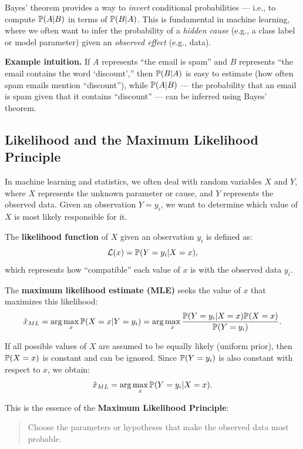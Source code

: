 \documentclass[10pt, letterpaper]{report}
\begin{document}
Bayes’ theorem provides a way to \textit{invert} conditional probabilities — i.e., to compute ${\mathbb P}(A|B)$ in terms of ${\mathbb P}(B|A)$.  
This is fundamental in machine learning, where we often want to infer the probability of a \emph{hidden cause} (e.g., a class label or model parameter) given an \emph{observed effect} (e.g., data).

\bigskip
\textbf{Example intuition.}  
If $A$ represents “the email is spam” and $B$ represents “the email contains the word ‘discount’,” then ${\mathbb P}(B|A)$ is easy to estimate (how often spam emails mention “discount”),  
while ${\mathbb P}(A|B)$ — the probability that an email is spam given that it contains “discount” — can be inferred using Bayes’ theorem.

\bigskip
\subsection{Likelihood and the Maximum Likelihood Principle}

In machine learning and statistics, we often deal with random variables $X$ and $Y$, where $X$ represents the unknown parameter or cause, and $Y$ represents the observed data.  
Given an observation $Y = y_i$, we want to determine which value of $X$ is most likely responsible for it.

The \textbf{likelihood function} of $X$ given an observation $y_i$ is defined as:
\begin{equation}
	\mathcal{L}(x) = {\mathbb P}(Y = y_i | X = x),
\end{equation}
which represents how “compatible” each value of $x$ is with the observed data $y_i$.

\bigskip
The \textbf{maximum likelihood estimate (MLE)} seeks the value of $x$ that maximizes this likelihood:
\begin{equation}
	\hat{x}_{ML} = \arg\max_x {\mathbb P}(X = x | Y = y_i) = \arg\max_x \frac{{\mathbb P}(Y = y_i | X = x){\mathbb P}(X = x)}{{\mathbb P}(Y = y_i)}.
\end{equation}

If all possible values of $X$ are assumed to be equally likely (uniform prior), then ${\mathbb P}(X=x)$ is constant and can be ignored.  
Since ${\mathbb P}(Y=y_i)$ is also constant with respect to $x$, we obtain:
\begin{equation}
	\hat{x}_{ML} = \arg\max_x {\mathbb P}(Y = y_i | X = x).
\end{equation}

\noindent
This is the essence of the \textbf{Maximum Likelihood Principle}:  
\begin{quote}
	Choose the parameters or hypotheses that make the observed data most probable.
\end{quote}
\end{document}
